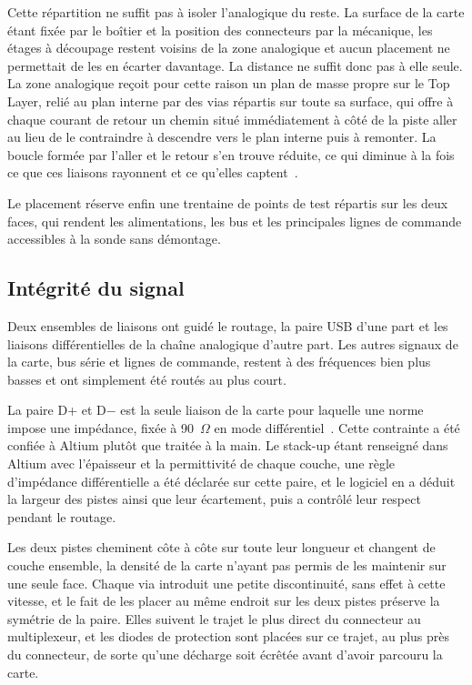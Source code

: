 Cette répartition ne suffit pas à isoler l'analogique du reste. La surface de la carte étant fixée par le boîtier et la position des connecteurs par la mécanique, les étages à découpage restent voisins de la zone analogique et aucun placement ne permettait de les en écarter davantage. La distance ne suffit donc pas à elle seule. La zone analogique reçoit pour cette raison un plan de masse propre sur le Top Layer, relié au plan interne par des vias répartis sur toute sa surface, qui offre à chaque courant de retour un chemin situé immédiatement à côté de la piste aller au lieu de le contraindre à descendre vers le plan interne puis à remonter. La boucle formée par l'aller et le retour s'en trouve réduite, ce qui diminue à la fois ce que ces liaisons rayonnent et ce qu'elles captent~\cite{prof_bogatin_rules_2013}.

Le placement réserve enfin une trentaine de points de test répartis sur les deux faces, qui rendent les alimentations, les bus et les principales lignes de commande accessibles à la sonde sans démontage.

\subsection{Intégrité du signal}

Deux ensembles de liaisons ont guidé le routage, la paire USB d'une part et les liaisons différentielles de la chaîne analogique d'autre part. Les autres signaux de la carte, bus série et lignes de commande, restent à des fréquences bien plus basses et ont simplement été routés au plus court.

La paire D+ et D$-$ est la seule liaison de la carte pour laquelle une norme impose une impédance, fixée à 90~$\Omega$ en mode différentiel~\cite{usb_implementers_forum_inc_universal_2026}. Cette contrainte a été confiée à Altium plutôt que traitée à la main. Le stack-up étant renseigné dans Altium avec l'épaisseur et la permittivité de chaque couche, une règle d'impédance différentielle a été déclarée sur cette paire, et le logiciel en a déduit la largeur des pistes ainsi que leur écartement, puis a contrôlé leur respect pendant le routage.

Les deux pistes cheminent côte à côte sur toute leur longueur et changent de couche ensemble, la densité de la carte n'ayant pas permis de les maintenir sur une seule face. Chaque via introduit une petite discontinuité, sans effet à cette vitesse, et le fait de les placer au même endroit sur les deux pistes préserve la symétrie de la paire. Elles suivent le trajet le plus direct du connecteur au multiplexeur, et les diodes de protection sont placées sur ce trajet, au plus près du connecteur, de sorte qu'une décharge soit écrêtée avant d'avoir parcouru la carte.

